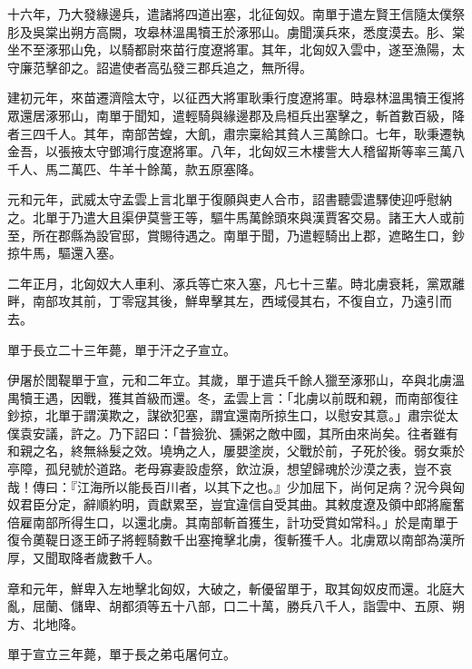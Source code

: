 \begin{pinyinscope}
十六年，乃大發緣邊兵，遣諸將四道出塞，北征匈奴。南單于遣左賢王信隨太僕祭肜及吳棠出朔方高闕，攻皋林溫禺犢王於涿邪山。虜聞漢兵來，悉度漠去。肜、棠坐不至涿邪山免，以騎都尉來苗行度遼將軍。其年，北匈奴入雲中，遂至漁陽，太守廉范擊卻之。詔遣使者高弘發三郡兵追之，無所得。

建初元年，來苗遷濟陰太守，以征西大將軍耿秉行度遼將軍。時皋林溫禺犢王復將眾還居涿邪山，南單于聞知，遣輕騎與緣邊郡及烏桓兵出塞擊之，斬首數百級，降者三四千人。其年，南部苦蝗，大飢，肅宗稟給其貧人三萬餘口。七年，耿秉遷執金吾，以張掖太守鄧鴻行度遼將軍。八年，北匈奴三木樓訾大人稽留斯等率三萬八千人、馬二萬匹、牛羊十餘萬，款五原塞降。

元和元年，武威太守孟雲上言北單于復願與吏人合市，詔書聽雲遣驛使迎呼慰納之。北單于乃遣大且渠伊莫訾王等，驅牛馬萬餘頭來與漢賈客交易。諸王大人或前至，所在郡縣為設官邸，賞賜待遇之。南單于聞，乃遣輕騎出上郡，遮略生口，鈔掠牛馬，驅還入塞。

二年正月，北匈奴大人車利、涿兵等亡來入塞，凡七十三輩。時北虜衰耗，黨眾離畔，南部攻其前，丁零寇其後，鮮卑擊其左，西域侵其右，不復自立，乃遠引而去。

單于長立二十三年薨，單于汗之子宣立。

伊屠於閭鞮單于宣，元和二年立。其歲，單于遣兵千餘人獵至涿邪山，卒與北虜溫禺犢王遇，因戰，獲其首級而還。冬，孟雲上言：「北虜以前既和親，而南部復往鈔掠，北單于謂漢欺之，謀欲犯塞，謂宜還南所掠生口，以慰安其意。」肅宗從太僕袁安議，許之。乃下詔曰：「昔獫狁、獯粥之敵中國，其所由來尚矣。往者雖有和親之名，終無絲髮之效。墝埆之人，屢嬰塗炭，父戰於前，子死於後。弱女乘於亭障，孤兒號於道路。老母寡妻設虛祭，飲泣淚，想望歸魂於沙漠之表，豈不哀哉！傳曰：『江海所以能長百川者，以其下之也。』少加屈下，尚何足病？況今與匈奴君臣分定，辭順約明，貢獻累至，豈宜違信自受其曲。其敕度遼及領中郎將龐奮倍雇南部所得生口，以還北虜。其南部斬首獲生，計功受賞如常科。」於是南單于復令薁鞮日逐王師子將輕騎數千出塞掩擊北虜，復斬獲千人。北虜眾以南部為漢所厚，又聞取降者歲數千人。

章和元年，鮮卑入左地擊北匈奴，大破之，斬優留單于，取其匈奴皮而還。北庭大亂，屈蘭、儲卑、胡都須等五十八部，口二十萬，勝兵八千人，詣雲中、五原、朔方、北地降。

單于宣立三年薨，單于長之弟屯屠何立。


\end{pinyinscope}
